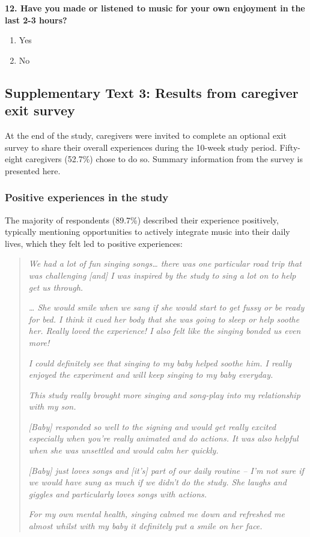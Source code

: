 \documentclass[
]{article}
\providecommand{\tightlist}{%
  \setlength{\itemsep}{0pt}\setlength{\parskip}{0pt}}
\begin{document}
\textbf{12. Have you made or listened to music for your own enjoyment in
the last 2-3 hours?}

\begin{enumerate}
\def\labelenumi{\alph{enumi}.}
\tightlist
\item
  Yes
\item
  No
\end{enumerate}

\subsection*{Supplementary Text 3: Results from caregiver exit
survey}\label{supplementary-text-3-results-from-caregiver-exit-survey}

At the end of the study, caregivers were invited to complete an optional
exit survey to share their overall experiences during the 10-week study
period. Fifty-eight caregivers (52.7\%) chose to do so. Summary
information from the survey is presented here.

\subsubsection*{Positive experiences in the
study}\label{positive-experiences-in-the-study}

The majority of respondents (89.7\%) described their experience
positively, typically mentioning opportunities to actively integrate
music into their daily lives, which they felt led to positive
experiences:

\begin{quote}
\textit{We had a lot of fun singing songs… there was one particular road trip that was challenging [and] I was inspired by the study to sing a lot on to help get us through.}
  
\textit{… She would smile when we sang if she would start to get fussy or be ready for bed. I think it cued her body that she was going to sleep or help soothe her. Really loved the experience! I also felt like the singing bonded us even more!}
  
\textit{I could definitely see that singing to my baby helped soothe him. I really enjoyed the experiment and will keep singing to my baby everyday.}
  
\textit{This study really brought more singing and song-play into my relationship with my son.}
  
\textit{[Baby] responded so well to the signing and would get really excited especially when you're really animated and do actions. It was also helpful when she was unsettled and would calm her quickly.}
  
\textit{[Baby] just loves songs and [it’s] part of our daily routine – I’m not sure if we would have sung as much if we didn’t do the study. She laughs and giggles and particularly loves songs with actions.}
  
\textit{For my own mental health, singing calmed me down and refreshed me almost whilst with my baby it definitely put a smile on her face.}
\end{quote}
\end{document}
